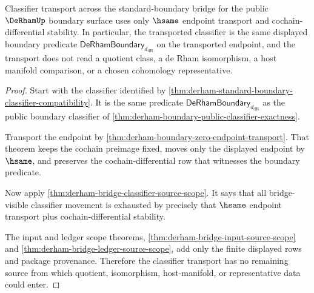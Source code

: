\begin{theorem}
\label{thm:derham-standard-boundary-classifier-transport}
Classifier transport across the standard-boundary bridge for the public
$\DeRhamUp$ boundary surface uses only $\hsame$ endpoint transport and
cochain-differential stability. In particular, the transported classifier is
the same displayed boundary predicate
$\mathsf{DeRhamBoundary}_{d_{\mathrm{dR}}}$ on the transported endpoint, and
the transport does not read a quotient class, a de Rham isomorphism, a host
manifold comparison, or a chosen cohomology representative.
\end{theorem}
\begin{proof}
Start with the classifier identified by
\autoref{thm:derham-standard-boundary-classifier-compatibility}. It is the
same predicate $\mathsf{DeRhamBoundary}_{d_{\mathrm{dR}}}$ as the public
boundary classifier of
\autoref{thm:derham-boundary-public-classifier-exactness}.

Transport the endpoint by
\autoref{thm:derham-boundary-zero-endpoint-transport}. That theorem keeps the
cochain preimage fixed, moves only the displayed endpoint by $\hsame$, and
preserves the cochain-differential row that witnesses the boundary predicate.

Now apply \autoref{thm:derham-bridge-classifier-source-scope}. It says that
all bridge-visible classifier movement is exhausted by precisely that
$\hsame$ endpoint transport plus cochain-differential stability.

The input and ledger scope theorems,
\autoref{thm:derham-bridge-input-source-scope} and
\autoref{thm:derham-bridge-ledger-source-scope}, add only the finite displayed
rows and package provenance. Therefore the classifier transport has no
remaining source from which quotient, isomorphism, host-manifold, or
representative data could enter.
\end{proof}

